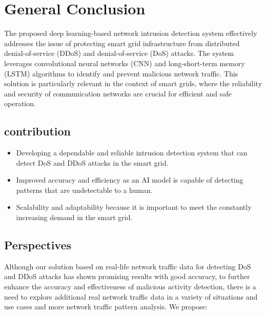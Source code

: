 \chapter*{General Conclusion} \label{chap:conclusion}





The proposed deep learning-based network intrusion detection system effectively addresses the issue of protecting smart grid infrastructure from distributed denial-of-service (DDoS) and denial-of-service (DoS) attacks. The system leverages convolutional neural networks (CNN) and long-short-term memory (LSTM) algorithms to identify and prevent malicious network traffic. This solution is particularly relevant in the context of smart grids, where the reliability and security of communication networks are crucial for efficient and safe operation.



\section*{contribution}



\begin{itemize}
    \item Developing a dependable and reliable intrusion detection system that can detect DoS and DDoS attacks in the smart grid.
    \item Improved accuracy and efficiency as an AI model is capable of detecting patterns that are undetectable to a human.
    \item Scalability and adaptability because it is important to meet the constantly increasing demand in the smart grid.
\end{itemize}


\section*{Perspectives}


Although our solution based on real-life network traffic data for detecting DoS and DDoS attacks has shown promising results with good accuracy, to further enhance the accuracy and effectiveness of malicious activity detection, there is a need to explore additional real network traffic data in a variety of situations and use cases and more network traffic pattern analysis. We propose:



